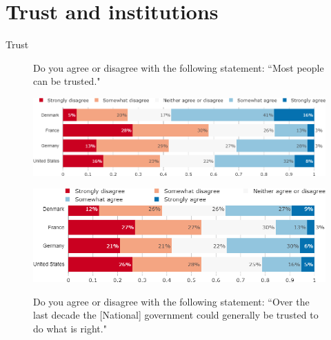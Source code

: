 \documentclass[aspectratio=169,9pt,dvipsnames]{beamer}
\begin{document}

\section{Trust and institutions}

\begin{frame}{Trust}%
\vspace{-.5cm}
\begin{figure}[h!]
\caption{Do you agree or disagree with the following statement: ``Most people can be trusted."}
\includegraphics[width=.8\textwidth]{../figures/country_comparison/can_trust_people_countries.png} \\
\vspace{.1cm}
\caption{Do you agree or disagree with the following statement: ``Over the last decade the [National] government could generally be trusted to do what is right."}
\includegraphics[width=.8\textwidth]{../figures/country_comparison/can_trust_govt_countries.png}\\
\end{figure}
\end{frame}
\end{document}
